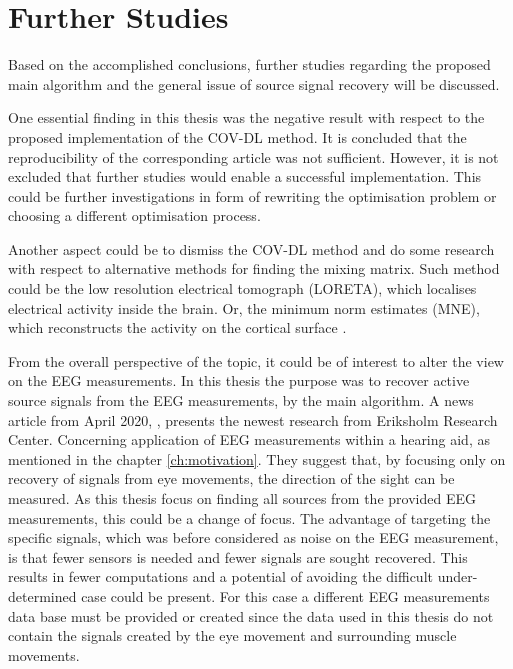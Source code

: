 \chapter{Further Studies}
Based on the accomplished conclusions, further studies regarding the proposed main algorithm and the general issue of source signal recovery will be discussed.

One essential finding in this thesis was the negative result with respect to the proposed implementation of the COV-DL method. It is concluded that the reproducibility of the corresponding article was not sufficient. However, it is not excluded that further studies would enable a successful implementation.  
This could be further investigations in form of rewriting the optimisation problem or choosing a different optimisation process. 

Another aspect could be to dismiss the COV-DL method and do some research with respect to alternative methods for finding the mixing matrix.   
Such method could be the low resolution electrical tomograph (LORETA), which localises electrical activity inside the brain. Or, the minimum norm estimates (MNE), which reconstructs the activity on the cortical surface \cite{??}.

From the overall perspective of the topic, it could be of interest to alter the view on the EEG measurements. In this thesis the purpose was to recover active source signals from the EEG measurements, by the main algorithm. 
A news article from April 2020, \cite{Ing2020}, presents the newest research from Eriksholm Research Center. Concerning application of EEG measurements within a hearing aid, as mentioned in the chapter \ref{ch:motivation}. They suggest that, by focusing only on recovery of signals from eye movements, the direction of the sight can be measured. 
As this thesis focus on finding all sources from the provided EEG measurements, this could be a change of focus. The advantage of targeting the specific signals, which was before considered as noise on the EEG measurement, is that fewer sensors is needed and fewer signals are sought recovered. This results in fewer computations and a potential of avoiding the difficult under-determined case could be present.      
For this case a different EEG measurements data base must be provided or created since the data used in this thesis do not contain the signals created by the eye movement and surrounding muscle movements.

